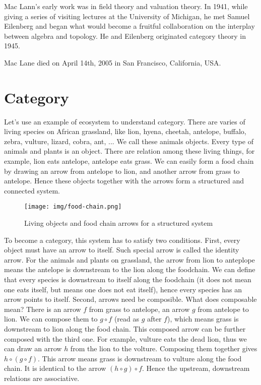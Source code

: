 \documentclass{article}
\begin{document}
Mac Lann's early work was in field theory and valuation theory. In 1941, while giving a series of visiting lectures at the University of Michigan, he met Samuel Eilenberg and began what would become a fruitful collaboration on the interplay between algebra and topology. He and Eilenberg originated category theory in 1945.

Mac Lane died on April 14th, 2005 in San Francisco, California, USA.

\section{Category}

Let's use an example of ecosystem to understand category. There are varies of living species on African grassland, like lion, hyena, cheetah, antelope, buffalo, zebra, vulture, lizard, cobra, ant, ... We call these animals objects. Every type of animals and plants is an object. There are relation among these living things, for example, lion eats antelope, antelope eats grass. We can easily form a food chain by drawing an arrow from antelope to lion, and another arrow from grass to antelope. Hence these objects together with the arrows form a structured and connected system.

\begin{figure}[htbp]
 \centering
 \texttt{[image: img/food-chain.png]}
 \caption{Living objects and food chain arrows for a structured system}
 \label{fig:food-chain}
\end{figure}

To become a category, this system has to satisfy two conditions. First, every object must have an arrow to itself. Such special arrow is called the identity arrow. For the animals and plants on grassland, the arrow from lion to anteplope means the antelope is downstream to the lion along the foodchain. We can define that every species is downstream to itself along the foodchain (it does not mean one eats itself, but means one does not eat itself), hence every species has an arrow points to itself. Second, arrows need be composible. What does composable mean? There is an arrow $f$ from grass to antelope, an arrow $g$ from antelope to lion. We can compose them to $g \circ f$ (read as $g$ after $f$), which means grass is downstream to lion along the food chain. This composed arrow can be further composed with the third one. For example, vulture eats the dead lion, thus we can draw an arrow $h$ from the lion to the volture. Composing them together gives $h \circ (g \circ f)$. This arrow means grass is downstream to vulture along the food chain. It is identical to the arrow $(h \circ g) \circ f$. Hence the upstream, downstream relations are associative.
\end{document}
